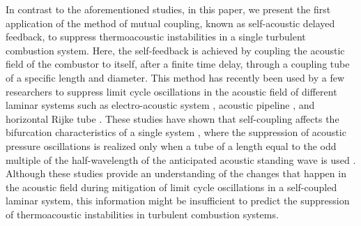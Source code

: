 \documentclass[twocolumn,10pt]{article} %
\begin{document}
In contrast to the aforementioned studies, in this paper, we present the first application of the method of mutual coupling, known as self-acoustic delayed feedback, to suppress thermoacoustic instabilities in a single turbulent combustion system. Here, the self-feedback is achieved by coupling the acoustic field of the combustor to itself, after a finite time delay, through a coupling tube of a specific length and diameter. This method has recently been used by a few researchers to suppress limit cycle oscillations in the acoustic field of different laminar systems such as electro-acoustic system \cite{biwa2016suppression}, acoustic pipeline \cite{lato2019passive}, and horizontal Rijke tube \cite{srikanth2021selfcoupling}. These studies have shown that self-coupling affects the bifurcation characteristics of a single system \cite{srikanth2021selfcoupling}, where the suppression of acoustic pressure oscillations is realized only when a tube of a length equal to the odd multiple of the half-wavelength of the anticipated acoustic standing wave is used \cite{biwa2016suppression, lato2019passive}. %
Although these studies provide an understanding of the changes that happen in the acoustic field during mitigation of limit cycle oscillations in a self-coupled laminar system, this information might be insufficient to predict the suppression of thermoacoustic instabilities in turbulent combustion systems. 
\end{document}
